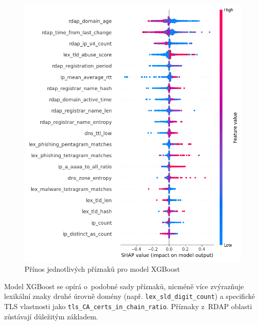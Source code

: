 \begin{figure}[!ht]
    \centering
    \includegraphics[width=1.0\textwidth]{obrazky-figures/shap_XgBoost.png}
    \caption{Přínos jednotlivých příznaků pro model XGBoost}
    \label{fig:shap_XgBoost}
\end{figure}

Model XGBoost se opírá o~podobné sady příznaků, nicméně více zvýrazňuje lexikální znaky druhé úrovně domény (např. \texttt{lex\_sld\_digit\_count}) a specifické TLS vlastnosti jako \texttt{tls\_CA\_certs\_in\_chain\_ratio}. Příznaky z~RDAP oblasti zůstávají důležitým základem.


